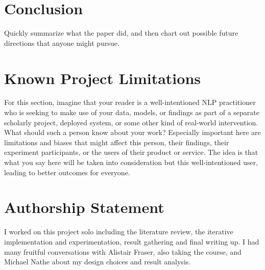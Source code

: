 \documentclass[10pt]{article}
\begin{document}
\section{Conclusion} 

Quickly summarize what the paper did, and then chart out possible future directions that anyone might pursue.

\section*{Known Project Limitations}

For this section, imagine that your reader is a well-intentioned NLP practitioner who is seeking to make use of your data, models, or findings as part of a separate scholarly project, deployed system, or some other kind of real-world intervention. What should such a person know about your work? Especially important here are limitations and biases that might affect this person, their findings, their experiment participants, or the users of their product or service. The idea is that what you say here will be taken into consideration but this well-intentioned user, leading to better outcomes for everyone.

\section*{Authorship Statement}

I worked on this project solo including the literature review, the iterative implementation and experimentation, result gathering and final writing up. I had many fruitful conversations with Alistair Fraser, also taking the course, and Michael Nathe about my design choices and result analysis. 





\end{document}
